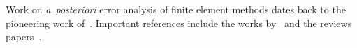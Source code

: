 Work on \emph{a~posteriori} error analysis of finite element methods
dates back to the pioneering work
of~\citet{BabuvskaRheinboldt1978}. Important references include the
works by~\citet{BankWeiser1985,ZienkiewiczZhu1987,
  ErikssonJohnson1991,ErikssonJohnson1995a,ErikssonJohnsonIII,ErikssonJohnson1995b,ErikssonJohnson1995c,ErikssonJohnsonLarsson1998,AinsworthOden1993}
and the reviews
papers~\citep{ErikssonEstepHansboEtAl1995,Verfurth1994,Verfurth1999,AinsworthOden2000,BeckerRannacher2001}.
